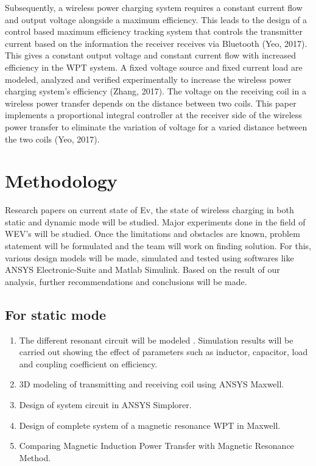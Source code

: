 \documentclass[12pt]{article}
\begin{document}
Subsequently, a wireless power charging system requires a constant current flow and output
voltage alongside a maximum efficiency. This leads to the design of a control based maximum
efficiency tracking system that controls the transmitter current based on the information the receiver
receives via Bluetooth (Yeo, 2017). This gives a constant output voltage and constant current flow
with increased efficiency in the WPT system. A fixed voltage source and fixed current load are
modeled, analyzed and verified experimentally to increase the wireless power charging system's 
efficiency (Zhang, 2017). The voltage on the receiving coil in a wireless power transfer depends on the
distance between two coils. This paper implements a proportional integral controller at the receiver
side of the wireless power transfer to eliminate the variation of voltage for a varied distance between
the two coils (Yeo, 2017). \cite{a2019}


\section{Methodology}
Research papers on current state of Ev, the state of wireless charging in both static and dynamic mode will be studied. Major experiments done in the field of WEV's will be studied. Once the limitations and obstacles are known, problem statement will be formulated and the team will work on finding solution. For this, various design models will be made, simulated and tested using softwares like ANSYS Electronic-Suite and Matlab Simulink. Based on the result of our analysis, further recommendations and conclusions will be made. 
\subsection{For static mode}
\begin{enumerate}
	\item The different resonant circuit will be modeled . Simulation results will be carried out showing the effect of parameters such as inductor, capacitor, load and coupling coefficient on efficiency. 
	\item 3D modeling of transmitting and receiving coil using ANSYS Maxwell. 
	\item Design of system circuit in ANSYS Simplorer. 
	\item Design of complete system of a magnetic resonance WPT in Maxwell. 
	\item Comparing Magnetic Induction Power Transfer with Magnetic Resonance Method. 
\end{enumerate}

\end{document}
